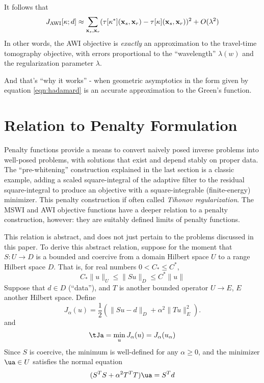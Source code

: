 It follows that
\begin{equation}
  \label{eqn:awitt}
J_{\rm AWI}[\kappa;d] \approx \sum_{{\bf x}_s,{\bf x}_r} (\tau[\kappa^*]({\bf
  x}_s,{\bf x}_r)-\tau[\kappa]({\bf x}_s,{\bf x}_r))^2 + O(\lambda^2)
\end{equation}
In other words, the AWI objective is {\em exactly} an approximation to
the travel-time tomography objective, with errors proportional to the
``wavelength'' $\lambda(w)$ and the regularization parameter
$\lambda$.

And that's ``why it works'' - when geometric asymptotics in the form
given by equation \ref{eqn:hadamard} is an accurate approximation to the Green's function.

\section{Relation to Penalty Formulation}
Penalty functions provide a means to convert naively posed
inverse problems into well-posed problems, with solutions that exist
and depend stably on proper data. The ``pre-whitening'' construction
explained in the last section is a classic example, adding a scaled
square-integral of the adaptive filter to the residual square-integral to
produce an objective with a square-integrable (finite-energy)
minimizer. This penalty construction if often called {\em Tihonov
  regularization}. The MSWI and AWI objective functions have a deeper
relation to a penalty construction, however: they are
suitably defined limits of penalty functions.

This relation is abstract, and does not just pertain to the problems
discussed in this paper. To derive this abstract relation, suppose for
the moment that $S:U \rightarrow D$ is a bounded and coercive from a
domain Hilbert space $U$ to a range Hilbert space $D$. That is, for
real numbers $0 < C_* \le C^*$,
\[
  C_*\|u\|_U \le \|Su\|_D \le C^*\|u\|
\]
Suppose that $d \in D$ (``data''), and $T$ is another bounded operator $U \rightarrow E$, $E$
another Hilbert space. Define
\begin{equation}
  \label{eqn:eq1}
  J_{\alpha}(u) = \frac{1}{2}(\|Su-d\|_D + \alpha^2\|Tu\|_E^2).
\end{equation}
and
\begin{equation}
  \label{eqn:eq0}
  \tJa= \min_u J_{\alpha}(u) = J_{\alpha}(u_{\alpha})
\end{equation}
Since $S$ is coercive, the minimum is well-defined for any
$\alpha \ge 0$, and the minimizer $\ua \in U$ satisfies the normal
equation
\begin{equation}
  \label{eqn:eq0n}
  (S^TS + \alpha^2 T^TT) \ua = S^Td
\end{equation}

